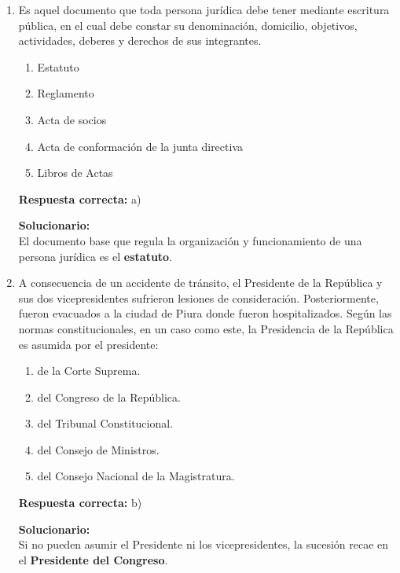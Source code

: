 \begin{enumerate}


\item  Es aquel documento que toda persona jurídica debe tener mediante escritura pública, en el cual debe constar su denominación, domicilio, objetivos, actividades, deberes y derechos de sus integrantes.
\begin{enumerate}[label=\alph*)]
	\item Estatuto
	\item Reglamento
	\item Acta de socios
	\item Acta de conformación de la junta directiva
	\item Libros de Actas
\end{enumerate}

\textbf{Respuesta correcta:} a)

\vspace{2mm}
\textbf{Solucionario:}\\
El documento base que regula la organización y funcionamiento de una persona jurídica es el \textbf{estatuto}.

\item  A consecuencia de un accidente de tránsito, el Presidente de la República y sus dos vicepresidentes sufrieron lesiones de consideración. Posteriormente, fueron evacuados a la ciudad de Piura donde fueron hospitalizados. Según las normas constitucionales, en un caso como este, la Presidencia de la República es asumida por el presidente:
\begin{enumerate}[label=\alph*)]
	\item de la Corte Suprema.
	\item del Congreso de la República.
	\item del Tribunal Constitucional.
	\item del Consejo de Ministros.
	\item del Consejo Nacional de la Magistratura.
\end{enumerate}

\textbf{Respuesta correcta:} b)

\vspace{2mm}
\textbf{Solucionario:}\\
Si no pueden asumir el Presidente ni los vicepresidentes, la sucesión recae en el \textbf{Presidente del Congreso}.

\end{enumerate}






